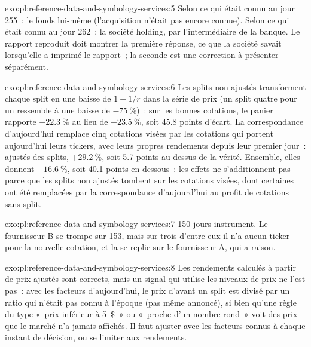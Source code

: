 \begin{solution}{exo:pl:reference-data-and-symbology-services:5}
Selon ce qui était connu au jour 255~: le fonds lui-même (l'acquisition n'était pas encore connue). Selon ce qui était connu au jour 262~: la société holding, par l'intermédiaire de la
banque. Le rapport reproduit doit montrer la première réponse, ce que la société savait lorsqu'elle a imprimé le rapport~; la seconde est une correction
à présenter séparément.
\end{solution}

\begin{solution}{exo:pl:reference-data-and-symbology-services:6}
Les splits non ajustés transforment chaque split en une baisse de $1 - 1/r$ dans la série de prix (un split quatre pour un ressemble à une baisse de $-75~\%$)~: sur les
bonnes cotations, le panier rapporte $-22.3~\%$ au lieu de $+23.5~\%$, soit 45.8 points d'écart. La correspondance d'aujourd'hui remplace cinq cotations visées par les
cotations qui portent aujourd'hui leurs tickers, avec leurs propres rendements depuis leur premier jour~: ajustés des splits, $+29.2~\%$, soit 5.7 points
au-dessus de la vérité. Ensemble, elles donnent $-16.6~\%$, soit 40.1 points en dessous~: les effets ne s'additionnent pas parce que les splits non ajustés tombent sur
les cotations visées, dont certaines ont été remplacées par la correspondance d'aujourd'hui au profit de cotations sans split.
\end{solution}

\begin{solution}{exo:pl:reference-data-and-symbology-services:7}
150 jours-instrument. Le fournisseur B se trompe sur 153, mais sur trois d'entre eux il n'a aucun ticker pour la nouvelle cotation, et la 
se replie sur le fournisseur A, qui a raison.
\end{solution}

\begin{solution}{exo:pl:reference-data-and-symbology-services:8}
Les rendements calculés à partir de prix ajustés sont corrects, mais un signal qui utilise les niveaux de prix ne l'est pas~: avec les facteurs d'aujourd'hui, le prix
d'avant un split est divisé par un ratio qui n'était pas connu à l'époque (pas même annoncé), si bien qu'une règle du type «~prix inférieur à 5~\$~» ou
«~proche d'un nombre rond~» voit des prix que le marché n'a jamais affichés. Il faut ajuster avec les facteurs connus à chaque instant de décision, ou
se limiter aux rendements.
\end{solution}

